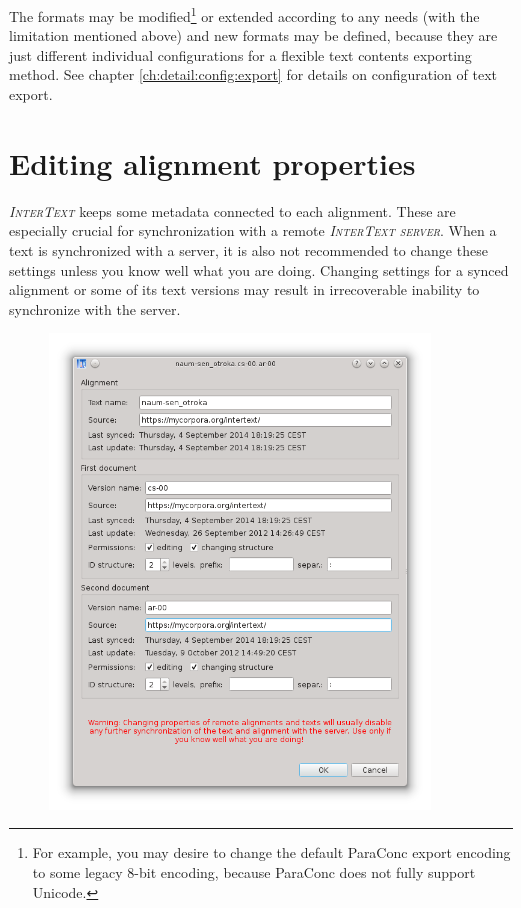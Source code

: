 \documentclass[a4paper,10pt,oneside]{book}
\newcommand{\IT}{\textit{\textsc{InterText}}\xspace}
\newcommand{\ITserver}{\textit{\textsc{InterText server}}\xspace}
\begin{document}
The formats may be modified\footnote{For example, you may desire to change the default ParaConc export encoding to some legacy 8-bit encoding, because ParaConc does not fully support Unicode.} or extended according to any needs (with the limitation mentioned above) and new formats may be defined, because they are just different individual configurations for a flexible text contents exporting method. See chapter \ref{ch:detail:config:export} for details on configuration of text export.

\section{Editing alignment properties}\label{ch:detail:managing_local:properties}

\IT keeps some metadata connected to each alignment. These are especially crucial for synchronization with a remote \ITserver. When a text is synchronized with a server, it is also not recommended to change these settings unless you know well what you are doing. Changing settings for a synced alignment or some of its text versions may result in irrecoverable inability to synchronize with the server.

\begin{figure}[htbf]
 \includegraphics[width=0.9\textwidth]{screenshots/properties.png}
\end{figure}
\end{document}

